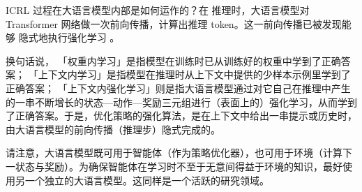 ICRL 过程在大语言模型内部是如何运作的？在
推理时，大语言模型对 Transformer 网络做一次前向传播，计算出推理 token。这一前向传播已被发现能够
隐式地执行强化学习 \citep{wang2024transformers}。
%

%
换句话说，
「权重内学习」是指模型在训练时已从训练好的权重中学到了正确答案；
「上下文内学习」是指模型在推理时从上下文中提供的少样本示例里学到了正确答案；
「上下文内强化学习」则是指大语言模型通过对它自己在推理中产生的一串不断增长的状态—动作—奖励三元组进行（表面上的）强化学习，从而学到了正确答案。于是，优化策略的强化算法，是在上下文中给出一串提示或历史时，由大语言模型的前向传播（推理步）隐式完成的。


请注意，大语言模型既可用于智能体（作为策略优化器），也可用于环境（计算下一状态与奖励）。为确保智能体在学习时不至于无意间得益于环境的知识，最好使用另一个独立的大语言模型。这同样是一个活跃的研究领域。

